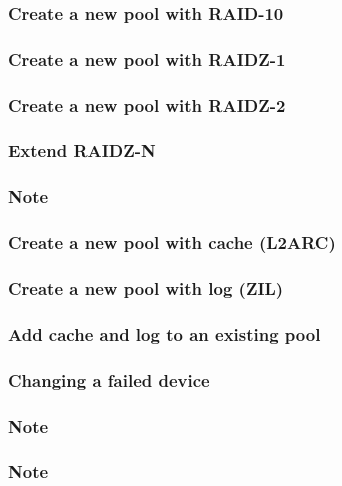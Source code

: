 \subsubsection{Create a new pool with RAID-10}

\subsubsection{Create a new pool with RAIDZ-1}

\subsubsection{Create a new pool with RAIDZ-2}

\subsubsection{Extend RAIDZ-N}

\subsubsection{Note}

\subsubsection{Create a new pool with cache (L2ARC)}

\subsubsection{Create a new pool with log (ZIL)}

\subsubsection{Add cache and log to an existing pool}

\subsubsection{Changing a failed device}

\subsubsection{Note}

\subsubsection{Note}

